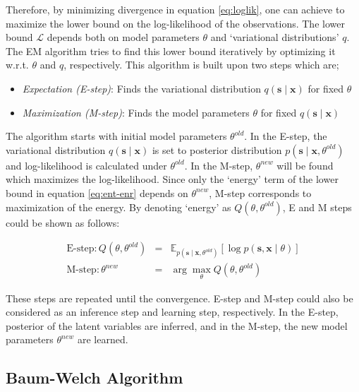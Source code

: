 Therefore, by minimizing divergence in equation \ref{eq:loglik}, one can achieve to maximize the lower bound on the log-likelihood of the observations. The lower bound $\mathcal{L}$ depends both on model parameters $\theta$ and `variational distributions' $q$. 
The EM algorithm tries to find this lower bound iteratively by optimizing it w.r.t. $\theta$ and $q$, respectively.  This algorithm is built upon two steps which are;

\begin{itemize}
    \item {\it Expectation (E-step)}: Finds the variational distribution  $q\left(\boldsymbol{s}\mid \boldsymbol{x}\right)$ for fixed $\theta$
    \item {\it Maximization (M-step)}: Finds the model parameters $\theta$ for fixed $q\left(\boldsymbol{s}\mid\boldsymbol{x}\right)$
\end{itemize}

The algorithm starts with initial model parameters $\theta^{old}$. In the E-step, the variational distribution $q\left(\boldsymbol{s}\mid \boldsymbol{x}\right)$ is set to posterior distribution $p\left(\boldsymbol{s}\mid \boldsymbol{x}, \theta^{old}\right)$ and log-likelihood is calculated under $\theta^{old}$.
In the M-step, $\theta^{new}$ will be found which maximizes the log-likelihood. Since only the `energy' term of the lower bound in equation \ref{eq:ent-enr} depends on $\theta^{new}$, M-step corresponds to maximization of the energy.
By denoting `energy' as $Q\left(\theta , \theta^{o l d}\right)$, E and M steps could be shown as follows:

\begin{eqnarray}
    \text{E-step}:Q\left(\theta , \theta^{old} \right)&=&\mathbb{E}_{p\left(\boldsymbol{s} \mid \boldsymbol{x}, \theta^{old}\right)}\left[\log p\left(\boldsymbol{s}, \boldsymbol{x} \mid \theta\right)\right] \\ 
    \text{M-step}:\theta^{new}&=&\arg \max _{\theta} Q\left(\theta , \theta^{old}\right)
\end{eqnarray}

These steps are repeated until the convergence. E-step and M-step could also be considered as an inference step and learning step, respectively. In the E-step, posterior of the latent variables are inferred, and in the M-step, the new model parameters $\theta^{new}$ are learned.

\subsection{Baum-Welch Algorithm}

